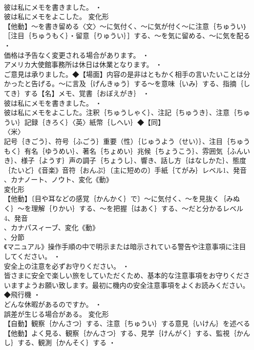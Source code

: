 \documentclass[8pt]{extreport}
\begin{document}
\begin{CJK}{UTF8}{min}
\\	彼は私にメモを書きました。 ・
\\	彼は私にメモをよこした。	変化形 
\\	【他動】～を書き留める〈文〉～に気付く、～に気が付く～に注意｛ちゅうい｝［注目｛ちゅうもく｝・留意｛りゅうい｝］する、～を気に留める、～に気を配る ・
\\	価格は予告なく変更される場合があります。 ・
\\	アメリカ大使館事務所は休日は休業となります。 ・
\\	ご意見は承りました。◆【場面】内容の是非はともかく相手の言いたいことは分かったと告げる。～に言及｛げんきゅう｝する～を意味｛いみ｝する、指摘｛してき｝する【名】メモ、覚書｛おぼえがき｝ ・
\\	彼は私にメモを書きました。 ・
\\	彼は私にメモをよこした。注釈｛ちゅうしゃく｝、注記｛ちゅうき｝、注意｛ちゅうい｝記録｛きろく｝〈英〉紙幣｛しへい｝◆【同】
\\	〈米〉
\\	記号｛きごう｝、符号｛ふごう｝重要（性）｛じゅうよう（せい）｝、注目｛ちゅうもく｝有名｛ゆうめい｝、著名｛ちょめい｝兆候｛ちょうこう｝、雰囲気｛ふんいき｝、様子｛ようす｝声の調子｛ちょうし｝、響き、話し方｛はなしかた｝、態度｛たいど｝《音楽》音符｛おんぷ｝〔主に短めの〕手紙｛てがみ｝レベル1、発音
\\	、カナノート、ノウト、変化《動》
\\	変化形 
\\	【他動】〔目や耳などの感覚｛かんかく｝で〕～に気付く、～を見抜く｛みぬく｝～を理解｛りかい｝する、～を把握｛はあく｝する、～だと分かるレベル4、発音
\\	、カナパスィーブ、変化《動》
\\	、分節
\\	《マニュアル》操作手順の中で明示または暗示されている警告や注意事項に注目してください。 ・
\\	安全上の注意を必ずお守りください。 ・
\\	皆さまに安全で楽しい旅をしていただくため、基本的な注意事項をお守りくださいますようお願い致します。最初に機内の安全注意事項をよくお読みください。◆飛行機 ・
\\	どんな休暇があるのですか。 ・
\\	誤差が生じる場合がある。	変化形 
\\	【自動】観察｛かんさつ｝する、注意｛ちゅうい｝する意見｛いけん｝を述べる【他動】よく見る、観察｛かんさつ｝する、見学｛けんがく｝する、監視｛かんし｝する、観測｛かんそく｝する ・

\end{CJK}
\end{document}
